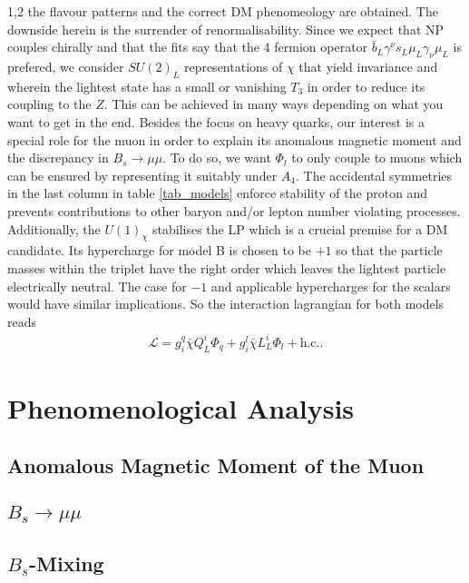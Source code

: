 \documentclass[11pt,a4paper,twoside]{article}
\begin{document}
\begin{spacing}{1,2}
the flavour patterns and the correct DM phenomeology are obtained. 
The downside herein is the surrender of renormalisability. Since we expect that NP couples chirally and that the fits say that the 4 fermion operator 
$\bar b_L \gamma^\nu s_L \mu_L \gamma_\nu \mu_L$ is prefered, we consider $SU(2)_L$ representations of $\chi$ that yield invariance and wherein the lightest
state has a small or vanishing $T_3$ in order to reduce its coupling to the $Z$. This can be achieved in many ways depending on what you want to get in the end. Besides the focus on heavy quarks,
our interest is a special role for the muon in order to explain its anomalous magnetic moment and the discrepancy in $B_s\rightarrow \mu\mu$. 
To do so, we want $\Phi_l$ to only couple to muons which can be ensured by representing it suitably under $A_4$.  
The accidental symmetries in the last column in table \ref{tab_models}
enforce stability of the proton and prevents contributions to other baryon and/or lepton number violating
processes. Additionally, the $U(1)_\chi$ stabilises the LP which is a crucial premise for a DM candidate. Its hypercharge for model B is chosen to be $+1$ 
so that the particle masses within the triplet have the right order which leaves the lightest particle electrically neutral. The case for $-1$ and applicable
hypercharges for the scalars would have similar implications. So the interaction lagrangian for both models reads
\begin{align}
 \mathcal{L} = g_i^q \bar \chi Q_L^i \Phi_q + g_i^l \bar \chi L_L^i \Phi_l + \text{h.c.}.
\end{align}




\section{Phenomenological Analysis}
\subsection{Anomalous Magnetic Moment of the Muon}

\subsection{$B_s\rightarrow \mu\mu$}


\subsection{$B_s$-Mixing}


\end{spacing}
\end{document}
